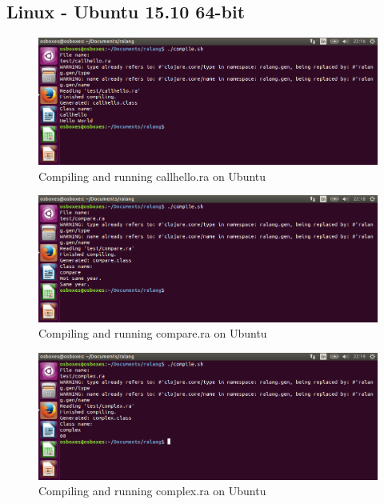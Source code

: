 \documentclass[a4paper]{article}
\begin{document}
\begin{appendices}
	\subsection{Linux - Ubuntu 15.10 64-bit}
	\begin{figure}[h!]
		\centering
		\includegraphics[width=\linewidth]{images/ubuntu_callhello.png}
		\caption[Compiling and running callhello.ra on Ubuntu 15.10 64-bit]{Compiling and running callhello.ra on Ubuntu}
		\label{fig:ubuntu_callhello}
	\end{figure}
	\begin{figure}[h!]
		\centering
		\includegraphics[width=\linewidth]{images/ubuntu_compare.png}
		\caption[Compiling and running compare.ra on Ubuntu 15.10 64-bit]{Compiling and running compare.ra on Ubuntu}
		\label{fig:ubuntu_compare}
	\end{figure}
	\begin{figure}[h!]
		\centering
		\includegraphics[width=\linewidth]{images/ubuntu_complex.png}
		\caption[Compiling and running complex.ra on Ubuntu 15.10 64-bit]{Compiling and running complex.ra on Ubuntu}

\end{figure}
\end{appendices}
\end{document}
